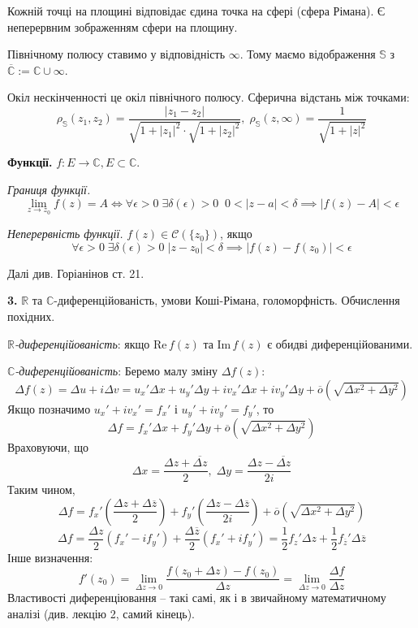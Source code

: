 \documentclass[14pt]{extarticle}
\begin{document}
Кожній точці на площині відповідає єдина точка на сфері (сфера Рімана). Є неперервним зображенням сфери на площину.

Північному полюсу ставимо у відповідність $\infty$. Тому маємо відображення $\mathbb{S}$ з $\overline{\mathbb{C}} := \mathbb{C} \cup \infty$. 

Окіл нескінченності це окіл північного полюсу. Сферична відстань між точками:
\[
\rho_{\mathbb{S}}(z_1,z_2) = \frac{|z_1-z_2|}{\sqrt{1+|z_1|^2}\cdot\sqrt{1+|z_2|^2}}, \; \rho_{\mathbb{S}}(z,\infty) = \frac{1}{\sqrt{1+|z|^2}}
\]

\textbf{Функції.} $f:E \to \mathbb{C}, E \subset \mathbb{C}$. 

\textit{Границя функції.}
\[
\lim_{z \to z_0}f(z) = A \iff \forall \epsilon > 0 \; \exists \delta(\epsilon) > 0 \;\; 0<|z-a|<\delta \implies |f(z)-A| < \epsilon
\]

\textit{Неперервність функції.} $f(z) \in \mathcal{C}(\{z_0\})$, якщо 
\[
\forall \epsilon > 0 \; \exists \delta(\epsilon) > 0 \; |z-z_0| < \delta \implies |f(z)-f(z_0)| < \epsilon
\]

Далі див. Горіанінов ст. 21.

\textbf{3.} $\mathbb{R}$ та $\mathbb{C}$-диференційованість, умови Коші-Рімана, голоморфність. Обчислення похідних.

\textit{$\mathbb{R}$-диференційованість}: якщо $\text{Re} \, f(z)$ та $\text{Im}\, f(z)$ є обидві диференційованими.

\textit{$\mathbb{C}$-диференційованість}: Беремо малу зміну $\Delta f(z)$:
\[
\Delta f(z) = \Delta u + i \Delta v = u_x'\Delta x + u_y'\Delta y + i v_x' \Delta x + iv_y'\Delta y + \overline{o}(\sqrt{\Delta x^2 + \Delta y^2})
\]
Якщо позначимо $u_x'+iv_x'=f_x'$ і $u_y'+iv_y'=f_y'$, то 
\[
\Delta f = f_x'\Delta x + f_y'\Delta y + \overline{o}(\sqrt{\Delta x^2 + \Delta y^2})
\]
Враховуючи, що
\[
\Delta x = \frac{\Delta z+\overline{\Delta z}}{2}, \; \Delta y = \frac{\Delta z - \overline{\Delta z}}{2i}
\]
Таким чином,
\[
\Delta f = f_x'\left(\frac{\Delta z + \Delta\overline{z}}{2}\right) + f_y'\left(\frac{\Delta z - \Delta\overline{z}}{2i}\right) + \overline{o}(\sqrt{\Delta x^2 + \Delta y^2})
\]
\[
\Delta f = \frac{\Delta z}{2}\left(f_x'-if_y'\right) + \frac{\Delta\overline{z}}{2}\left(f_x' + if_y'\right) = \frac{1}{2}f_z'\Delta z + \frac{1}{2}f_{\overline{z}}'\Delta\overline{z}
\]
Інше визначення:
\[
f'(z_0) = \lim_{\Delta z \to 0} \frac{f(z_0+\Delta z)-f(z_0)}{\Delta z} = \lim_{\Delta z \to 0} \frac{\Delta f}{\Delta z}
\]
Властивості диференціювання -- такі самі, як і в звичайному математичному аналізі (див. лекцію 2, самий кінець).
\end{document}
